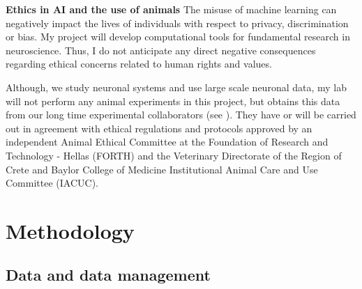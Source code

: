 \documentclass[B2,COG]{ercgrant}
\begin{document}
\textbf{Ethics in AI and the use of animals}
The misuse of machine learning can negatively impact the lives of individuals with respect to privacy, discrimination or bias. 
My  project will develop computational tools for fundamental research in neuroscience. 
Thus, I do not anticipate any direct negative consequences regarding ethical concerns related to human rights and values.

Although, we study neuronal systems and use large scale neuronal data, my lab will not perform any animal experiments in this project, but obtains this data from our long time experimental collaborators (see ). 
They have or will be carried out in agreement with ethical regulations and protocols approved by an independent Animal Ethical Committee at the Foundation of Research and Technology - Hellas (FORTH) and the Veterinary Directorate of the Region of Crete and Baylor College of Medicine Institutional Animal Care and Use Committee (IACUC).
\section{Methodology}
\subsection{Data and data management}
\label{sub:data}
\end{document}
